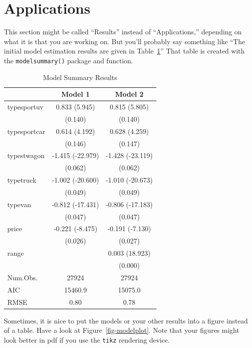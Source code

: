 \documentclass[
  letterpaper,
  authoryear]{elsarticle}
\begin{document}

\hypertarget{applications}{%
\section{Applications}\label{applications}}

This section might be called ``Results'' instead of ``Applications,''
depending on what it is that you are working on. But you'll probably say
something like ``The initial model estimation results are given in
Table~\ref{tbl-estimationresults}'' That table is created with the
\texttt{modelsummary()} package and function.

\hypertarget{tbl-estimationresults}{}
\begin{table}
\caption{\label{tbl-estimationresults}Model Summary Results }\tabularnewline

\centering
\begin{tabular}[t]{lcc}
\toprule
  & Model 1 & Model 2\\
\midrule
typesportuv & 0.833 (5.945) & 0.815 (5.805)\\
 & (0.140) & (0.140)\\
typesportcar & 0.614 (4.192) & 0.628 (4.259)\\
 & (0.146) & (0.147)\\
typestwagon & -1.415 (-22.979) & -1.428 (-23.119)\\
 & (0.062) & (0.062)\\
typetruck & -1.002 (-20.600) & -1.010 (-20.673)\\
 & (0.049) & (0.049)\\
typevan & -0.812 (-17.431) & -0.806 (-17.183)\\
 & (0.047) & (0.047)\\
price & -0.221 (-8.475) & -0.191 (-7.130)\\
 & (0.026) & (0.027)\\
range &  & 0.003 (18.923)\\
 &  & (0.000)\\
\midrule
Num.Obs. & 27924 & 27924\\
AIC & 15460.9 & 15075.0\\
RMSE & 0.80 & 0.78\\
\bottomrule
\end{tabular}
\end{table}

Sometimes, it is nice to put the models or your other results into a
figure instead of a table. Have a look at Figure~\ref{fig-modelplot}.
Note that your figures might look better in pdf if you use the
\texttt{tikz} rendering device.
\end{document}

